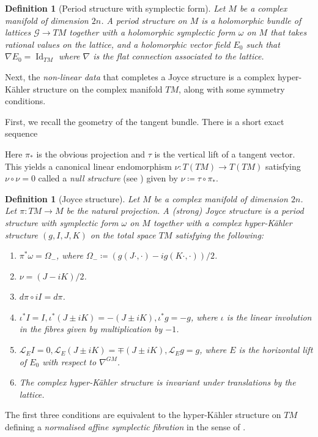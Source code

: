 \documentclass[a4paper,12pt,reqno]{amsart}
\newcounter{counter2}
\numberwithin{equation}{section}
\numberwithin{counter2}{section}
\newcounter{counter3}
\newtheorem{defn}[counter2]{Definition}
\begin{document}
\begin{defn}[Period structure with symplectic form]
Let $M$ be a complex manifold of dimension $2n$.  A period structure on $M$ is a holomorphic bundle of lattices $\mathcal{G} \to TM$ together with a holomorphic symplectic form $\omega$ on $M$ that takes rational values on the lattice,  and a holomorphic vector field $E_0$ such that $\nabla E_0 = \operatorname{Id}_{TM}$ where $\nabla$ is the flat connection associated to the lattice.  
\end{defn}
 Next,  the \textit{non-linear data} that completes a Joyce structure is a complex hyper-K\"ahler structure on the complex manifold $TM$,  along with some symmetry conditions.  \par First,  we recall the geometry of the tangent bundle.  There is a short exact sequence 
 \begin{center}
\end{center}
Here $\pi_*$ is the obvious projection and $\tau$ is the vertical lift of a tangent vector.  
This yields a canonical linear endomorphism $\nu: T(TM) \to T(TM)$ satisfying $\nu \circ \nu = 0$ called a \textit{null structure} (see \cite{D}) given by $\nu \coloneqq \tau \circ \pi_*$.  
\begin{defn}[Joyce structure]\label{J}
Let $M$ be a complex manifold of dimension $2n$.  Let $\pi: TM \to M$ be the natural projection.  A (strong) Joyce structure is a period structure with symplectic form $\omega$ on $M$ together with a complex hyper-K\"ahler structure $(g,I,J,K)$ on the total space $TM$ satisfying the following:
\begin{enumerate}
\item $\pi^*\omega = \Omega_{-}$,  where $\Omega_{-} \coloneqq (g(J\cdot,\cdot) - ig(K\cdot,\cdot))/2$.
\item $\nu = (J-iK)/2$.
\item $d\pi \circ iI = d\pi$.
\item $\iota^*I = I,  \iota^*(J \pm iK) = -(J \pm iK),  \iota^*g = -g$,  where $\iota$ is the linear involution in the fibres given by multiplication by $-1$.  
\item $\mathcal{L}_EI = 0,  \mathcal{L}_{E}(J \pm iK) = \mp(J \pm iK),  \mathcal{L}_Eg = g$,  where $E$ is the horizontal lift of $E_0$ with respect to  $\nabla^{GM}$.  
\item The complex hyper-K\"ahler structure is invariant under translations by the lattice.
\end{enumerate}
\end{defn}
The first three conditions are equivalent to the hyper-K\"ahler structure on $TM$ defining a \textit{normalised affine symplectic fibration} in the sense of \cite{BS}.  
\end{document}
